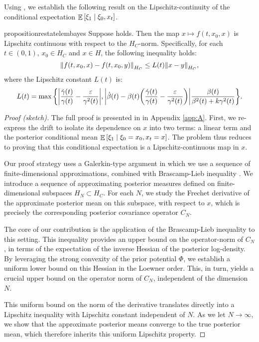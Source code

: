 Using , we establish the following result on the Lipschitz-continuity of the conditional expectation \(\mathop{\mathbb{E}}\qty[ \xi_{1} \mid \xi_{0}, x_{t}]\).

\begin{restatable}{proposition}{restatelembayes}\label{lem:bayes}
  Suppose  holds. Then the map \(x \mapsto f(t, x_{0}, x)\) is Lipschitz continuous with respect to the \(H_{C}\)-norm. Specifically, for each \(t \in (0, 1)\), \(x_{0} \in H_{C}\) and \(x \in H\), the following inequality holds:
  \[
    \norm{f(t, x_{0}, x) - f(t, x_{0}, y)}_{H_{C}} \leq L(t) \norm{x - y}_{H_{C}},
  \]
  where the Lipschitz constant \(L(t)\) is:
  \[
    L(t) =  \mathop{\underset{}{\max}}\qty{\abs{\frac{\dot{\gamma}(t)}{\gamma(t)} - \frac{\varepsilon}{\gamma^{2}(t)}}, \abs{\dot{\beta}(t) - \beta(t)\qty(\frac{\dot{\gamma}(t)}{\gamma(t)} - \frac{\varepsilon}{\gamma^{2}(t)})} \frac{\beta(t)}{\beta^{2}(t) + k \gamma^{2}(t)}}.
  \]
\end{restatable}
\begin{proof}[Proof (sketch)]
  The full proof is presented in  in Appendix \ref{app:A}.
  First, we re-express the drift to isolate its dependence on \(x\) into two terms: a linear term and the posterior conditional mean \(\mathop{\mathbb{E}}\qty[\xi_{1} \mid \xi_{0} = x_{0}, x_{t}= x]\). The problem thus reduces to proving that this conditional expectation is a Lipschitz-continuous map in \(x\).

  Our proof strategy uses a Galerkin-type argument in which we use a sequence of finite-dimensional approximations, combined with Brascamp-Lieb inequality \citep{brascamp1976extensions}. We introduce a sequence of approximating posterior measures defined on finite-dimensional subspaces \(H_{N} \subset H_{C}\). For each \(N\), we study the Frechet derivative of the approximate posterior mean on this subspace, with respect to \(x\), which is precisely the corresponding posterior covariance operator \(C_{N}\).

  The core of our contribution is the application of the Brascamp-Lieb inequality to this setting. This inequality provides an upper bound on the operator-norm of \(C_{N}\), in terms of the expectation of the inverse Hessian of the posterior log-density. By leveraging the strong convexity of the prior potential \(\Phi\), we establish a uniform lower bound on this Hessian in the Loewner order. This, in turn, yields a crucial upper bound on the operator norm of \(C_{N}\), independent of the dimension \(N\).

  This uniform bound on the norm of the derivative translates directly into a Lipschitz inequality with Lipschitz constant independent of \(N\). As we let \(N \to \infty\), we show that the approximate posterior means converge to the true posterior mean, which therefore inherits this uniform Lipschitz property.
\end{proof}

